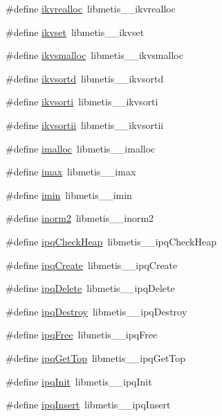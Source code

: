 \begin{DoxyCompactItemize}
\item 
\#define \hyperlink{a00212_ad5f4f40c28a344de54b4e4809902f44b}{ikvrealloc}~libmetis\+\_\+\+\_\+ikvrealloc
\item 
\#define \hyperlink{a00212_aac2414434c3f2ff897895f786e676851}{ikvset}~libmetis\+\_\+\+\_\+ikvset
\item 
\#define \hyperlink{a00212_a3f3660eff5d5325316781f991a861f22}{ikvsmalloc}~libmetis\+\_\+\+\_\+ikvsmalloc
\item 
\#define \hyperlink{a00212_aae93e7af8ca05ebc62d3e9c6db43c103}{ikvsortd}~libmetis\+\_\+\+\_\+ikvsortd
\item 
\#define \hyperlink{a00212_ac4af530daef0a190e86d57122dae04f1}{ikvsorti}~libmetis\+\_\+\+\_\+ikvsorti
\item 
\#define \hyperlink{a00212_aef78d3c33b7b297f35a3474f52b839ba}{ikvsortii}~libmetis\+\_\+\+\_\+ikvsortii
\item 
\#define \hyperlink{a00212_aec204c6dace2c559eb9a7dec0cc92d67}{imalloc}~libmetis\+\_\+\+\_\+imalloc
\item 
\#define \hyperlink{a00212_a788916a7426baf172c67386359720d6d}{imax}~libmetis\+\_\+\+\_\+imax
\item 
\#define \hyperlink{a00212_a0305edf26cc83c037bc5e8b0fc64918b}{imin}~libmetis\+\_\+\+\_\+imin
\item 
\#define \hyperlink{a00212_a3732ed58cafee7ecad6f94ec4d2ef31f}{inorm2}~libmetis\+\_\+\+\_\+inorm2
\item 
\#define \hyperlink{a00212_aaa338a40bc6e8470ff3e95b811d4b716}{ipq\+Check\+Heap}~libmetis\+\_\+\+\_\+ipq\+Check\+Heap
\item 
\#define \hyperlink{a00212_a0c7261200072abc592084cd1118c4e46}{ipq\+Create}~libmetis\+\_\+\+\_\+ipq\+Create
\item 
\#define \hyperlink{a00212_a2fb24dddd7429b51c5f6ec13ca077e25}{ipq\+Delete}~libmetis\+\_\+\+\_\+ipq\+Delete
\item 
\#define \hyperlink{a00212_a4b3dce5462a5f2aa88e66b8d3f9b3928}{ipq\+Destroy}~libmetis\+\_\+\+\_\+ipq\+Destroy
\item 
\#define \hyperlink{a00212_a65eec060a6d3a5596a1b9b2280b48881}{ipq\+Free}~libmetis\+\_\+\+\_\+ipq\+Free
\item 
\#define \hyperlink{a00212_ab34734e4a0406a111e6a06269fd61d88}{ipq\+Get\+Top}~libmetis\+\_\+\+\_\+ipq\+Get\+Top
\item 
\#define \hyperlink{a00212_ad5cf5d462ce7de92640ebbef1ae96818}{ipq\+Init}~libmetis\+\_\+\+\_\+ipq\+Init
\item 
\#define \hyperlink{a00212_adaa617c34d38e097631acf424ca1eae6}{ipq\+Insert}~libmetis\+\_\+\+\_\+ipq\+Insert

\end{DoxyCompactItemize}

